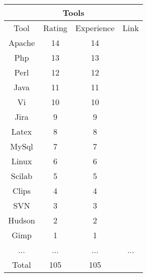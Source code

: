 \begin{longtable}{|c|c|c|c|}
\hline
\multicolumn{4}{|c|}{Tools} \\
\hline
Tool & Rating & Experience & Link\\
\hline
Apache & 14 & 14 & \\
\hline
Php & 13 & 13 & \\
\hline
Perl & 12 & 12 & \\
\hline
Java & 11 & 11 & \\
\hline
Vi & 10 & 10 & \\
\hline
Jira & 9 & 9 & \\
\hline
Latex & 8 & 8 & \\
\hline
MySql & 7 & 7 & \\
\hline
Linux & 6 & 6 & \\
\hline
Scilab & 5 & 5 & \\
\hline
Clips & 4 & 4 & \\
\hline
SVN & 3 & 3 & \\
\hline
Hudson & 2 & 2 & \\
\hline
Gimp & 1 & 1 & \\
\hline
 ... & ... & ... & ... \\
\hline
Total & 105 & 105 & \\
\hline
\end{longtable}
